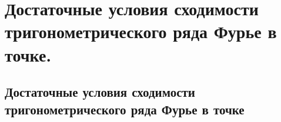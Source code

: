\chapter{Достаточные условия сходимости тригонометрического ряда Фурье в точке.}
\section{Достаточные условия сходимости тригонометрического ряда Фурье в точке}


